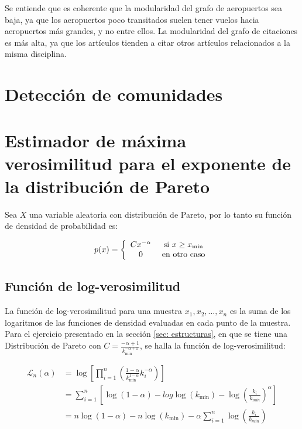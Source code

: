 \documentclass{article}
\begin{document}
Se entiende que es coherente que la modularidad del grafo de aeropuertos sea baja, ya que los aeropuertos poco transitados suelen tener vuelos hacia aeropuertos más grandes, y no entre ellos. La modularidad del grafo de citaciones es más alta, ya que los artículos tienden a citar otros artículos relacionados a la misma disciplina.

\section{Detección de comunidades} \label{sec: comunidades}

\section{Estimador de máxima verosimilitud para el exponente de la distribución de Pareto} \label{sec: pareto}

Sea $X$ una variable aleatoria con distribución de Pareto, por lo tanto su función de densidad de probabilidad es:

$$p(x) = \left\lbrace \begin{array}{c c} C x^{-\alpha} & \text{ si } x\geq x_\text{min} \\ 0 & \text{ en otro caso} \end{array}\right.$$

\subsection{Función de log-verosimilitud}

La función de log-verosimilitud para una muestra $x_1, x_2, \ldots, x_n$ es la suma de los logaritmos de las funciones de densidad evaluadas en cada punto de la muestra. Para el ejercicio presentado en la sección \ref{sec: estructuras}, en que se tiene una Distribución de Pareto con $C = \frac{-\alpha+1}{k_{\text{min}}^{-\alpha+1}}$, se halla la función de log-verosimilitud:

\begin{align}
    \mathcal{L}_n(\alpha) & = \log \left[\prod_{i=1}^{n} \left( \frac{1-\alpha}{k_{\text{min}}^{1-\alpha}} k_i^{-\alpha} \right) \right] \nonumber               \\
                          & = \sum_{i=1}^{n} \left[ \log(1-\alpha) - log\log(k_{\text{min}}) - \log \left(\frac{k_i}{k_{min}} \right)^{\alpha} \right] \nonumber \\
                          & = n \log(1-\alpha) - n\log(k_{\text{min}}) - \alpha \sum_{i=1}^{n} \log\left(\frac{k_i}{k_{min}} \right)
\end{align}
\end{document}
